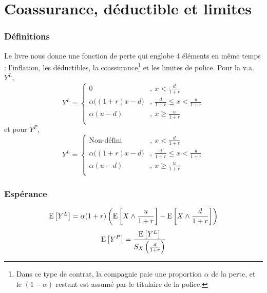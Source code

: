 \documentclass[12pt, french]{report}
\begin{document}
\section{Coassurance, déductible et limites}
\subsubsection{Définitions}
Le livre nous donne une fonction de perte qui englobe 4 éléments en même temps : l'inflation, les déductibles, la coassurance\footnote{Dans ce type de contrat, la compagnie paie une proportion $\alpha$ de la perte, et le $(1-\alpha)$ restant est assumé par le titulaire de la police.} et les limites de police. Pour la v.a. $Y^L$,
\begin{equation}
Y^L = 
\begin{cases}
0		& ,\ x  < \frac{d}{1+r} \\
\alpha \Big( (1+r) x - d \Big)	& ,\ \frac{d}{1+r} \leq x < \frac{u}{1+r} \\
\alpha (u-d)		& ,\ x \geq \frac{u}{1+r} \\
\end{cases}
\end{equation}
et pour $Y^P$,
\begin{equation}
Y^L = 
\begin{cases}
\text{Non-défini}		& ,\ x  < \frac{d}{1+r} \\
\alpha \Big( (1+r) x - d \Big)	& ,\ \frac{d}{1+r} \leq x < \frac{u}{1+r} \\
\alpha (u-d)		& ,\ x \geq \frac{u}{1+r} \\
\end{cases}
\end{equation}

\subsubsection{Espérance}
\begin{equation}
\mathrm{E} \left[ Y^L \right] = \alpha (1+r) \left( \mathrm{E} \left[ X \wedge \frac{u}{1+r} \right] - \mathrm{E} \left[ X \wedge \frac{d}{1+r} \right]   \right)
\end{equation}
\begin{equation}
\mathrm{E} \left[ Y^P \right] = \frac{\mathrm{E} \left[ Y^L \right]}{S_X \left( \frac{d}{1+r} \right)}
\end{equation}
\end{document}
